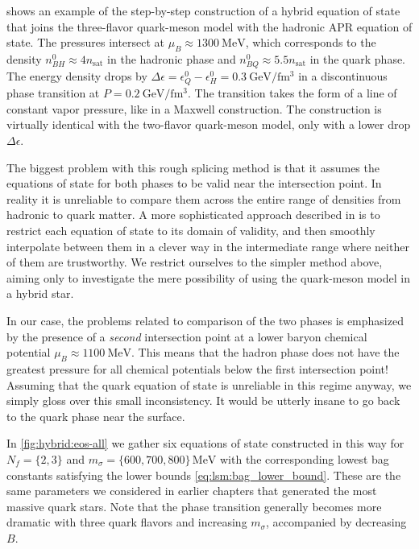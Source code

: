  shows an example of the step-by-step construction of a hybrid equation of state
that joins the three-flavor quark-meson model
with the hadronic APR equation of state.
The pressures intersect at $\mu_B \approx \SI{1300}{\mega\electronvolt}$,
which corresponds to the density $n_{BH}^0 \approx 4 n_\text{sat}$ in the hadronic phase
and $n_{BQ}^0 \approx 5.5 n_\text{sat}$ in the quark phase.
The energy density drops by $\Delta \epsilon = \epsilon_Q^0 - \epsilon_H^0 = \SI{0.3}{\giga\electronvolt\per\femto\meter\cubed}$
in a discontinuous phase transition at $P = \SI{0.2}{\giga\electronvolt\per\femto\meter\cubed}$.
The transition takes the form of a line of constant vapor pressure, like in a Maxwell construction.
The construction is virtually identical with the two-flavor quark-meson model,
only with a lower drop $\Delta \epsilon$.

The biggest problem with this rough splicing method is that it assumes the equations of state for both phases to be valid near the intersection point.
In reality it is unreliable to compare them across the entire range of densities from hadronic to quark matter.
A more sophisticated approach described in \cite[section V-F]{ref:quark_star_review}
is to restrict each equation of state to its domain of validity,
and then smoothly interpolate between them in a clever way
in the intermediate range where neither of them are trustworthy.
We restrict ourselves to the simpler method above,
aiming only to investigate the mere possibility of using the quark-meson model in a hybrid star.

In our case,
the problems related to comparison of the two phases is emphasized
by the presence of a \emph{second} intersection point at a lower baryon chemical potential $\mu_B \approx \SI{1100}{\mega\electronvolt}$.
This means that the hadron phase does not have the greatest pressure for all chemical potentials below the first intersection point!
Assuming that the quark equation of state is unreliable in this regime anyway,
we simply gloss over this small inconsistency.
It would be utterly insane to go back to the quark phase near the surface.

In \cref{fig:hybrid:eos-all} we gather six equations of state constructed in this way
for $N_f = \{2,3\}$ and $m_\sigma = \{600,700,800\} \, \si{\mega\electronvolt}$
with the corresponding lowest bag constants satisfying the lower bounds \eqref{eq:lsm:bag_lower_bound}.
These are the same parameters we considered in earlier chapters that generated the most massive quark stars.
Note that the phase transition generally becomes more dramatic
with three quark flavors
and increasing $m_\sigma$,
accompanied by decreasing $B$.

